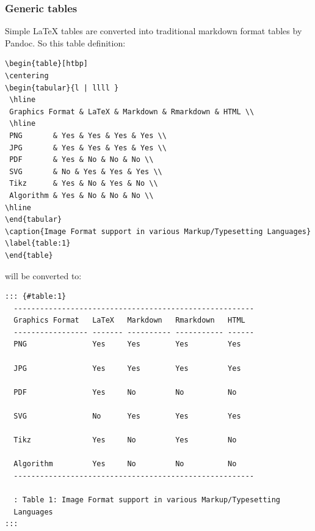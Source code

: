 \hypertarget{generic-tables}{%
\subsubsection{Generic tables}\label{generic-tables}}

Simple LaTeX tables are converted into traditional markdown format tables by Pandoc. So this table definition:

\begin{verbatim}
\begin{table}[htbp]
\centering
\begin{tabular}{l | llll }
 \hline
 Graphics Format & LaTeX & Markdown & Rmarkdown & HTML \\
 \hline
 PNG       & Yes & Yes & Yes & Yes \\
 JPG       & Yes & Yes & Yes & Yes \\
 PDF       & Yes & No & No & No \\
 SVG       & No & Yes & Yes & Yes \\
 Tikz      & Yes & No & Yes & No \\
 Algorithm & Yes & No & No & No \\
\hline
\end{tabular}
\caption{Image Format support in various Markup/Typesetting Languages}
\label{table:1}
\end{table}
\end{verbatim}

will be converted to:

\begin{verbatim}
::: {#table:1}
  -------------------------------------------------------
  Graphics Format   LaTeX   Markdown   Rmarkdown   HTML
  ----------------- ------- ---------- ----------- ------
  PNG               Yes     Yes        Yes         Yes

  JPG               Yes     Yes        Yes         Yes

  PDF               Yes     No         No          No

  SVG               No      Yes        Yes         Yes

  Tikz              Yes     No         Yes         No

  Algorithm         Yes     No         No          No
  -------------------------------------------------------

  : Table 1: Image Format support in various Markup/Typesetting
  Languages
:::
\end{verbatim}

